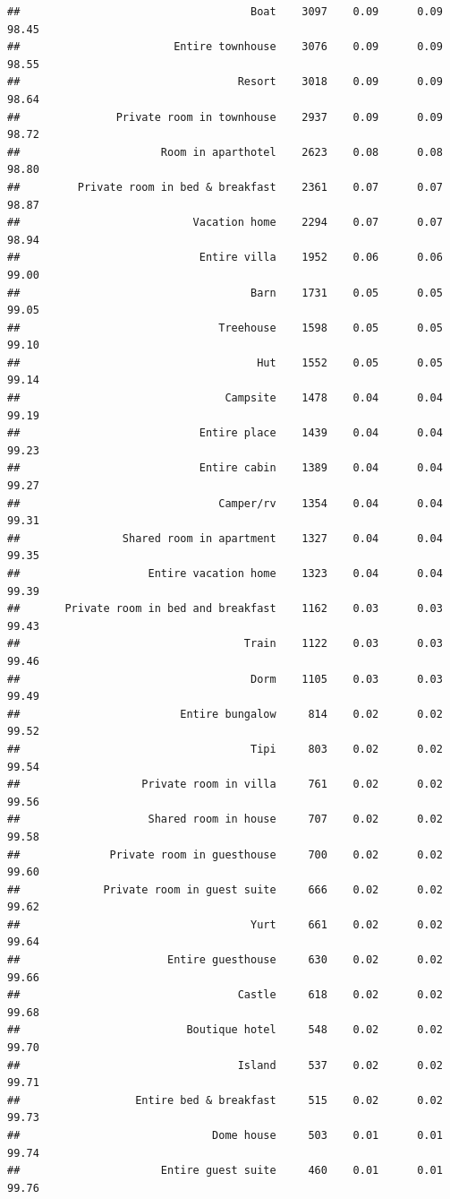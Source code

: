 \documentclass[]{article}
\begin{document}
\begin{verbatim}
##                                    Boat    3097    0.09      0.09   98.45
##                        Entire townhouse    3076    0.09      0.09   98.55
##                                  Resort    3018    0.09      0.09   98.64
##               Private room in townhouse    2937    0.09      0.09   98.72
##                      Room in aparthotel    2623    0.08      0.08   98.80
##         Private room in bed & breakfast    2361    0.07      0.07   98.87
##                           Vacation home    2294    0.07      0.07   98.94
##                            Entire villa    1952    0.06      0.06   99.00
##                                    Barn    1731    0.05      0.05   99.05
##                               Treehouse    1598    0.05      0.05   99.10
##                                     Hut    1552    0.05      0.05   99.14
##                                Campsite    1478    0.04      0.04   99.19
##                            Entire place    1439    0.04      0.04   99.23
##                            Entire cabin    1389    0.04      0.04   99.27
##                               Camper/rv    1354    0.04      0.04   99.31
##                Shared room in apartment    1327    0.04      0.04   99.35
##                    Entire vacation home    1323    0.04      0.04   99.39
##       Private room in bed and breakfast    1162    0.03      0.03   99.43
##                                   Train    1122    0.03      0.03   99.46
##                                    Dorm    1105    0.03      0.03   99.49
##                         Entire bungalow     814    0.02      0.02   99.52
##                                    Tipi     803    0.02      0.02   99.54
##                   Private room in villa     761    0.02      0.02   99.56
##                    Shared room in house     707    0.02      0.02   99.58
##              Private room in guesthouse     700    0.02      0.02   99.60
##             Private room in guest suite     666    0.02      0.02   99.62
##                                    Yurt     661    0.02      0.02   99.64
##                       Entire guesthouse     630    0.02      0.02   99.66
##                                  Castle     618    0.02      0.02   99.68
##                          Boutique hotel     548    0.02      0.02   99.70
##                                  Island     537    0.02      0.02   99.71
##                  Entire bed & breakfast     515    0.02      0.02   99.73
##                              Dome house     503    0.01      0.01   99.74
##                      Entire guest suite     460    0.01      0.01   99.76

\end{verbatim}
\end{document}
